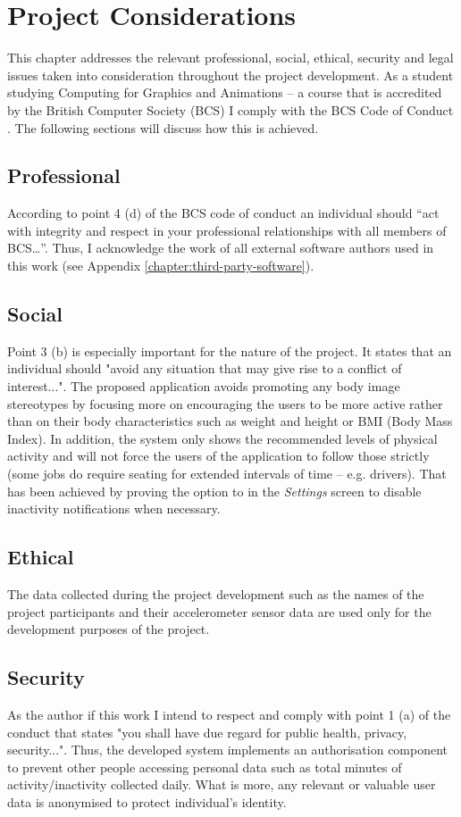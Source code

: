 \chapter{Project Considerations}
This chapter addresses the relevant professional, social, ethical, security and legal issues taken into consideration throughout the project development. As a student studying Computing for Graphics and Animations – a course that is accredited by the British Computer Society (BCS) I comply with the BCS Code of Conduct \citep{bcs_2017}. The following sections will discuss how this is achieved.
    
    \section{Professional}
    According to point 4 (d) of the BCS code of conduct an individual should “act with integrity and respect in your professional relationships with all members of BCS…”. Thus, I acknowledge the work of all external software authors used in this work (see Appendix \ref{chapter:third-party-software}).

    \section{Social}
    Point 3 (b) is especially important for the nature of the project. It states that an individual should "avoid any situation that may give rise to a conflict of interest...". The proposed application avoids promoting any body image stereotypes by focusing more on encouraging the users to be more active rather than on their body characteristics such as weight and height or BMI (Body Mass Index). In addition, the system only shows the recommended levels of physical activity and will not force the users of the application to follow those strictly (some jobs do require seating for extended intervals of time – e.g. drivers). That has been achieved by proving the option to in the \textit{Settings} screen to disable inactivity notifications when necessary.
    
    \section{Ethical}
    The data collected during the project development such as the names of the project participants and their accelerometer sensor data are used only for the development purposes of the project. 
    
    \section{Security}
    As the author if this work I intend to respect and comply with point 1 (a) of the conduct that states "you shall have due regard for public health, privacy, security...". Thus, the developed system implements an authorisation component to prevent other people accessing personal data such as total minutes of activity/inactivity collected daily. What is more, any relevant or valuable user data is anonymised to protect individual’s identity.


